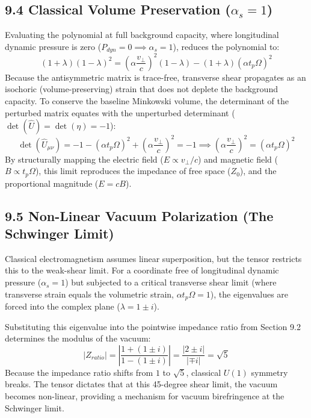 \subsection*{9.4 Classical Volume Preservation ($\alpha_s = 1$)} %
Evaluating the polynomial at full background capacity, where longitudinal dynamic pressure is zero ($P_{dyn} = 0 \implies \alpha_s = 1$), reduces the polynomial to: 
\begin{equation} 
    (1 + \lambda) (1 - \lambda)^2 = \left(\alpha \frac{v_\perp}{c}\right)^2 (1 - \lambda) - (1 + \lambda)(\alpha t_p \Omega)^2 
\end{equation} 
Because the antisymmetric matrix is trace-free, transverse shear propagates as an isochoric (volume-preserving) strain that does not deplete the background capacity. To conserve the baseline Minkowski volume, the determinant of the perturbed matrix equates with the unperturbed determinant ($\det(\hat{U}) = \det(\eta) = -1$): 
\begin{equation} 
    \det(\hat{U}_{\mu\nu}) = -1 - (\alpha t_p \Omega)^2 + \left(\alpha \frac{v_\perp}{c}\right)^2 = -1 \implies \left(\alpha \frac{v_\perp}{c}\right)^2 = (\alpha t_p \Omega)^2 
\end{equation} 
By structurally mapping the electric field ($E \propto v_\perp/c$) and magnetic field ($B \propto t_p \Omega$), this limit reproduces the impedance of free space ($Z_0$), and the proportional magnitude ($E = cB$). 

\subsection*{9.5 Non-Linear Vacuum Polarization (The Schwinger Limit)} 
Classical electromagnetism assumes linear superposition, but the tensor restricts this to the weak-shear limit. For a coordinate free of longitudinal dynamic pressure ($\alpha_s = 1$) but subjected to a critical transverse shear limit (where transverse strain equals the volumetric strain, $\alpha t_p \Omega = 1$), the eigenvalues are forced into the complex plane ($\lambda = 1 \pm i$). 

Substituting this eigenvalue into the pointwise impedance ratio from Section 9.2 determines the modulus of the vacuum: 
\begin{equation}
    |Z_{ratio}| = \left| \frac{1 + (1 \pm i)}{1 - (1 \pm i)} \right| = \frac{|2 \pm i|}{|\mp i|} = \sqrt{5}
\end{equation}
Because the impedance ratio shifts from $1$ to $\sqrt{5}$, classical $U(1)$ symmetry breaks. The tensor dictates that at this 45-degree shear limit, the vacuum becomes non-linear, providing a mechanism for vacuum birefringence at the Schwinger limit.


